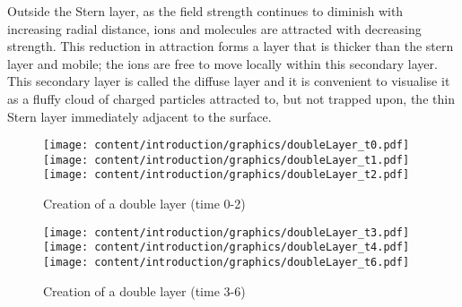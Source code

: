     Outside the Stern layer, as the field strength continues to diminish with increasing radial distance, ions and molecules are attracted with decreasing strength.
    This reduction in attraction forms a layer that is thicker than the stern layer and mobile; the ions are free to move locally within this secondary layer.
    This secondary layer is called the diffuse layer and it is convenient to visualise it as a fluffy cloud of charged particles attracted to, but not trapped upon, the thin Stern layer immediately adjacent to the surface.

    \begin{figure}
      \begin{center}
        \texttt{[image: content/introduction/graphics/doubleLayer\_t0.pdf]}
        \texttt{[image: content/introduction/graphics/doubleLayer\_t1.pdf]}
        \texttt{[image: content/introduction/graphics/doubleLayer\_t2.pdf]}
      \end{center}
      \caption{Creation of a double layer (time 0-2)}
      \label{fig:doubleLayer_set1}
    \end{figure}

    \begin{figure}
      \begin{center}
        \texttt{[image: content/introduction/graphics/doubleLayer\_t3.pdf]}
        \texttt{[image: content/introduction/graphics/doubleLayer\_t4.pdf]}
        \texttt{[image: content/introduction/graphics/doubleLayer\_t6.pdf]}
      \end{center}
      \caption{Creation of a double layer (time 3-6)}
      \label{fig:doubleLayer_set2}
    \end{figure}